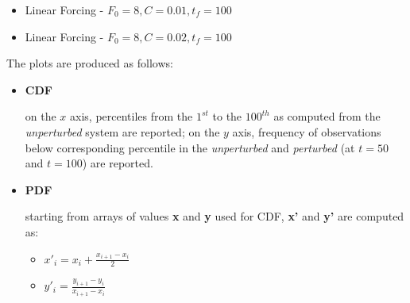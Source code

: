 \documentclass{article}
\begin{document}
\begin{itemize}
	\item Linear Forcing - $F_0=8, C=0.01, t_f=100$
	\item Linear Forcing - $F_0=8, C=0.02, t_f=100$
\end{itemize}
The plots are produced as follows:
\begin{itemize}
	\item \textbf{CDF} 
	
	on the $x$ axis, percentiles from the $1^{st}$ to the $100^{th}$ as computed from the \textit{unperturbed} system are reported; on the $y$ axis, frequency of observations below corresponding percentile in the \textit{unperturbed} and \textit{perturbed} (at $t=50$ and $t=100$) are reported.
	  
	\item \textbf{PDF}
	
	starting from arrays of values \textbf{x} and \textbf{y} used for CDF, \textbf{x'} and \textbf{y'} are computed as:
	
	\begin{itemize}
		\item $x'_i = x_i + \frac{x_{i+1} - x_i}{2}$
		\item $y'_i = \frac{y_{i+1} - y_i}{x_{i+1} - x_i}$
	\end{itemize}
	
	
\end{itemize}
\end{document}
